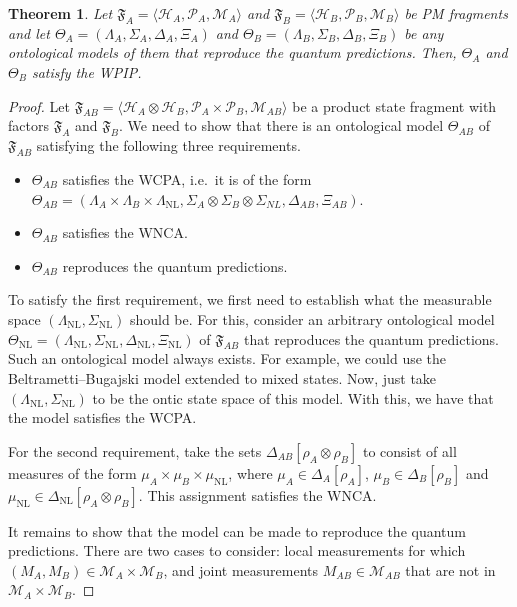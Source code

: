 \documentclass[DIV=calc,paper=a4,fontsize=11pt,twocolumn]{scrartcl} %
\theoremstyle{definition}
\theoremstyle{plain}
\newtheorem{theorem}[definition]{Theorem}
\newcommand{\Hilb}[1][]{\ensuremath{\mathcal{H}_{#1}}}
\begin{document}
\begin{theorem}
\label{thm:CCPA:reprod}
Let $\mathfrak{F}_A = \langle \Hilb[A], \mathcal{P}_A, \mathcal{M}_A
\rangle$ and $\mathfrak{F}_B = \langle \Hilb[B], \mathcal{P}_B,
\mathcal{M}_B \rangle$ be PM fragments and let $\Theta_A =
(\Lambda_A, \Sigma_A, \Delta_A, \Xi_A )$ and $\Theta_B = (\Lambda_B,
\Sigma_B, \Delta_B, \Xi_B)$ be any ontological models of them that
reproduce the quantum predictions.  Then, $\Theta_A$ and $\Theta_B$
satisfy the WPIP.
\end{theorem}
\begin{proof}
Let $\mathfrak{F}_{AB} = \langle \Hilb[A] \otimes \Hilb[B],
\mathcal{P}_A \times \mathcal{P}_B, \mathcal{M}_{AB} \rangle$ be a
product state fragment with factors $\mathfrak{F}_A$ and
$\mathfrak{F}_B$.  We need to show that there is an ontological
model $\Theta_{AB}$ of $\mathfrak{F}_{AB}$ satisfying the following
three requirements.
\begin{itemize}
\item $\Theta_{AB}$ satisfies the WCPA, i.e.\ it is of the form
$\Theta_{AB} = (\Lambda_A \times \Lambda_B \times
\Lambda_{\text{NL}}, \Sigma_A \otimes \Sigma_B \otimes
\Sigma_{NL}, \Delta_{AB}, \Xi_{AB})$.
\item $\Theta_{AB}$ satisfies the WNCA.
\item $\Theta_{AB}$ reproduces the quantum predictions.
\end{itemize}

To satisfy the first requirement, we first need to establish what
the measurable space $(\Lambda_{\text{NL}}, \Sigma_{\text{NL}})$
should be.  For this, consider an arbitrary ontological model
$\Theta_{\text{NL}} = ( \Lambda_{\text{NL}}, \Sigma_{\text{NL}},
\Delta_{\text{NL}}, \Xi_{\text{NL}})$ of $\mathfrak{F}_{AB}$ that
reproduces the quantum predictions.  Such an ontological model
always exists.  For example, we could use the Beltrametti--Bugajski
model extended to mixed states.  Now, just take
$(\Lambda_{\text{NL}}, \Sigma_{\text{NL}})$ to be the ontic state
space of this model.  With this, we have that the model satisfies
the WCPA.

For the second requirement, take the sets $\Delta_{AB}[\rho_A
\otimes \rho_B]$ to consist of all measures of the form $\mu_A
\times \mu_B \times \mu_{\text{NL}}$, where $\mu_A \in
\Delta_A[\rho_A]$, $\mu_B \in \Delta_B[\rho_B]$ and $\mu_{\text{NL}}
\in \Delta_{\text{NL}}[\rho_A \otimes \rho_B]$.  This assignment
satisfies the WNCA.

It remains to show that the model can be made to reproduce the
quantum predictions.  There are two cases to consider: local
measurements for which $(M_A,M_B) \in \mathcal{M}_A \times
\mathcal{M}_B$, and joint measurements $M_{AB} \in \mathcal{M}_{AB}$
that are not in $\mathcal{M}_A \times \mathcal{M}_B$.


\end{proof}
\end{document}
